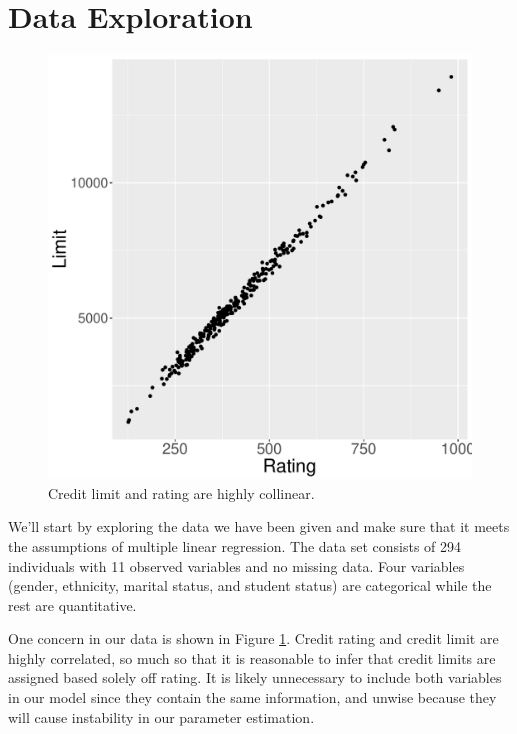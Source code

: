 \documentclass{article}
\begin{document}
\section{Data Exploration}
\begin{figure}
\centering
\includegraphics[scale=.3]{limitRating.pdf}
\caption{Credit limit and rating are highly collinear. }
\label{lr}
\end{figure}

We'll start by exploring the data we have been given and make sure that it meets the assumptions of multiple linear regression. The data set consists of 294 individuals with 11 observed variables and no missing data. Four variables (gender, ethnicity, marital status, and student status) are categorical while the rest are quantitative.

One concern in our data is shown in Figure \ref{lr}. Credit rating and credit limit are highly correlated, so much so that it is reasonable to infer that credit limits are assigned based solely off rating. It is likely unnecessary to include both variables in our model since they contain the same information, and unwise because they will cause instability in our parameter estimation.
\end{document}
